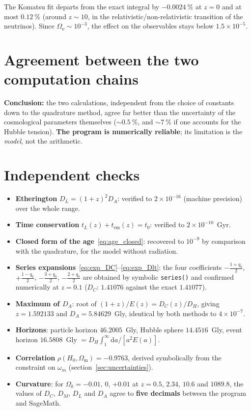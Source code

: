 \documentclass[11pt,a4paper,openany]{report}
\newcommand{\Hzero}{H_{0}}
\newcommand{\Om}{\Omega_{\mathrm{m}}}
\newcommand{\Ok}{\Omega_{k}}
\newcommand{\dif}{\mathrm{d}}
\begin{document}
\noindent The Komatsu fit departs from the exact integral by $-0.0024~\%$ at
$z=0$ and at most $0.12~\%$ (around $z\sim 10$, in the
relativistic/non-relativistic transition of the neutrinos). Since
$\Omega_{\nu} \sim 10^{-3}$, the effect on the observables stays below
$1.5\times10^{-5}$.

\section{Agreement between the two computation chains}



\noindent \textbf{Conclusion:} the two calculations, independent from the
choice of constants down to the quadrature method, agree far better than the
uncertainty of the cosmological parameters themselves ($\sim 0.5~\%$, and
$\sim 7~\%$ if one accounts for the Hubble tension). \textbf{The program is
numerically reliable}; its limitation is the \emph{model}, not the arithmetic.

\section{Independent checks}

\begin{itemize}[topsep=3pt]
\item \textbf{Etherington} $D_{L} = (1+z)^{2}D_{A}$: verified to
$2\times10^{-16}$ (machine precision) over the whole range.
\item \textbf{Time conservation} $t_{L}(z) + t_{\text{em}}(z) = t_{0}$: verified
to $2\times10^{-10}$~Gyr.
\item \textbf{Closed form of the age}~\eqref{eq:age_closed}: recovered to
$10^{-9}$ by comparison with the quadrature, for the model without radiation.
\item \textbf{Series expansions}~\eqref{eq:exp_DC}--\eqref{eq:exp_Dlt}: the four
coefficients $-\tfrac{1+q_{0}}{2}$, $+\tfrac{1-q_{0}}{2}$,
$-\tfrac{3+q_{0}}{2}$, $-\tfrac{2+q_{0}}{2}$ are obtained by symbolic
\texttt{series()} and confirmed numerically at $z=0.1$ ($D_{C}$: $1.41076$
against the exact $1.41077$).
\item \textbf{Maximum of $D_{A}$}: root of $(1+z)/E(z) = D_{C}(z)/D_{H}$, giving
$z = 1.592133$ and $D_{A} = 5.84629$~Gly, identical by both methods to
$4\times10^{-7}$.
\item \textbf{Horizons}: particle horizon $46.2005$~Gly, Hubble sphere
$14.4516$~Gly, event horizon $16.5808$~Gly
$= D_{H}\int_{1}^{\infty} \dif a/[a^{2}E(a)]$.
\item \textbf{Correlation} $\rho(\Hzero,\Om) = -0.9763$, derived symbolically
from the constraint on $\omega_m$ (section~\ref{sec:uncertainties}).
\item \textbf{Curvature}: for $\Ok = -0.01$, $0$, $+0.01$ at $z = 0.5$, $2.34$,
$10.6$ and $1089.8$, the values of $D_{C}$, $D_{M}$, $D_{L}$ and $D_{A}$ agree
to \textbf{five decimals} between the program and SageMath.
\end{itemize}
\end{document}
